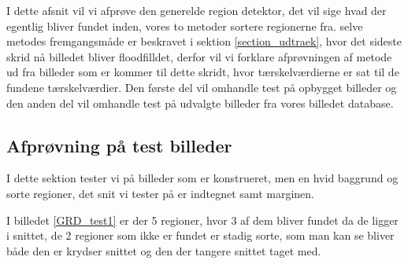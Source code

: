 {\sffamily
I dette afsnit vil vi afprøve den generelde region detektor, det vil
sige hvad der egentlig bliver fundet inden, vores to metoder sortere
regionerne fra. selve metodes fremgangsmåde er beskravet i sektion
\ref{section_udtraek}, hvor det sideste skrid nå billedet
bliver floodfilldet, derfor vil vi forklare afprøvningen af metode ud
fra billeder som er kommer til dette skridt, hvor tærskelværdierne er
sat til de fundene tærskelværdier. Den første del vil omhandle test på
opbygget billeder og den anden del vil omhandle test på udvalgte
billeder fra vores billedet database.
}

\subsection{Afprøvning på test billeder}
I dette sektion tester vi på billeder som er konstrueret, men en hvid
baggrund og sorte regioner, det snit vi tester på er indtegnet samt
marginen. 

I billedet \ref{GRD_test1} er der 5 regioner, hvor 3 af dem bliver
fundet da de ligger i snittet, de 2 regioner som ikke er fundet er
stadig sorte, som man kan se bliver både den er krydser snittet og den
der tangere snittet taget med. 

\begin{figure}[!h]
    \centering
		\hspace{1em}
    	\hspace{1em}
        \caption[]{}
     \label{GRD_test1_sammen}
\end{figure}

